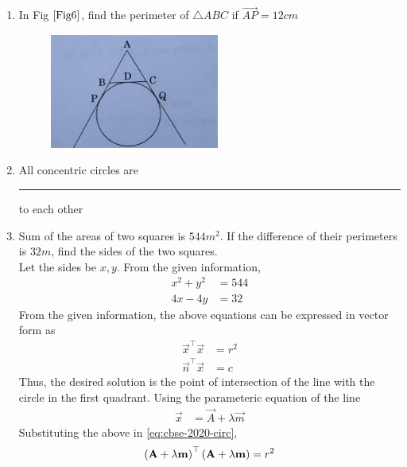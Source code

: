 \documentclass[journal,12pt,twocolumn]{IEEEtran}
\begin{document}
\begin{enumerate}
\begin{figure}[h!]
    	\caption{}
    	\label{Fig5}
     \end{figure}
     \item In Fig $\ref{Fig6}$, find the perimeter of $\triangle ABC$ if $\vec{AP} = 12cm$\\
    \begin{figure}[h!]
        \centering
        \includegraphics[width=0.5\columnwidth]{Fig6.png}
    	\caption{}
    	\label{Fig6}
     \end{figure}
\item All concentric circles are \rule{1.5cm}{0.15mm} to each other\\
        \item Sum of the areas of two squares is $544 m^2$. If the difference of their perimeters is $32m$, find the sides of the two squares.\\
		\solution Let the sides be $x, y$.  From the given information, 
		    \begin{align}
			    x^2 +y^2 &= 544
			    \\
			    4x - 4y &= 32
		    \end{align}
		    From the given information, the above equations can be expressed in vector form as 
		    \begin{align}
			    \label{eq:cbse-2020-circ}
			    \vec{x}^{\top}\vec{x} &= r^2
			    \\
			    \vec{n}^{\top}\vec{x} &= c
		    \end{align}
		    Thus, the desired solution is the point of intersection of the line with the circle in the first quadrant.  Using the parameteric equation of the line 
		    \begin{align}
			    \label{eq:cbse-2020-circ-line-param}
			    \vec{x} &= \vec{A} + \lambda \vec{m}
		    \end{align}
			    Substituting the above in \eqref{eq:cbse-2020-circ}, 
		    \begin{multline}
			    \brak{ \vec{A} + \lambda \vec{m}}^{\top}
			    \brak{ \vec{A} + \lambda \vec{m}}
			    = r^2
			    \\

\end{multline}
\end{enumerate}
\end{document}
